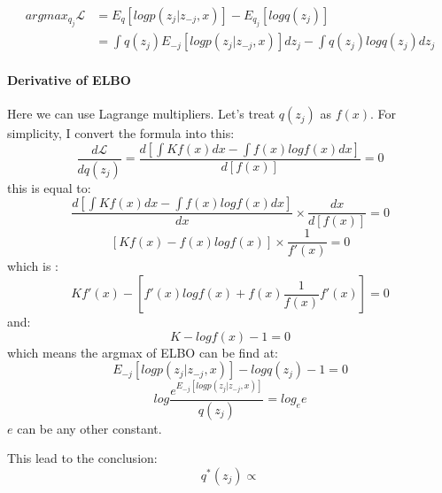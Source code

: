 \documentclass{article}
\begin{document}
\begin{align*}
argmax_{q_{j}} \mathcal{L} &=E_{q}[logp(z_{j}|z_{-j},x)]-E_{q_{j}}[logq(z_{j})] \\
&= \int q(z_{j})E_{-j}[logp(z_{j}|z_{-j},x)]dz_{j}-\int q(z_{j})logq(z_{j})dz_{j}
\end{align*}

\paragraph{Derivative of ELBO}Here we can use Lagrange multipliers. Let's treat $q(z_{j})$ as $f(x)$.
For simplicity, I convert the formula into this:
$$\frac{d \mathcal{L}}{dq(z_{j})}=\frac{d[\int Kf(x)dx- \int f(x)logf(x)dx]}{d[f(x)]}=0$$
this is equal to:
$$\frac{d[\int Kf(x)dx- \int f(x)logf(x)dx]}{dx} \times \frac{dx}{d[f(x)]}=0$$
$$ [ K f(x)-f(x)logf(x)] \times \frac{1}{f'(x)}=0$$
which is :
$$Kf'(x)-[f'(x)logf(x)+f(x) \frac{1}{f(x)}f'(x)]  =0$$
and:
$$K-logf(x)-1=0$$
which means the argmax of ELBO can be find at: 
$$E_{-j}[logp(z_{j}|z_{-j},x)]-logq(z_{j})-1=0$$
$$log \frac{ e^{E_{-j}[logp(z_{j}|z_{-j},x)]}}{q(z_{j})}= log_{e}e $$
$e$ can be any other constant. 

This lead to the conclusion:
$$q^{*}(z_{j}) \propto $$
\end{document}
